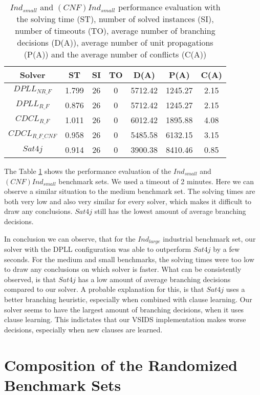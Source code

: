 \begin{table}[!htb]
\centering
\caption[$Ind_{small}$ and $(CNF)Ind_{small}$ performance evaluation]{$Ind_{small}$ and $(CNF)Ind_{small}$ performance evaluation with the solving time (ST), number of solved instances (SI), number of timeouts (TO), average number of branching decisions (D(A)), average number of unit propagations (P(A)) and the average number of conflicts (C(A))}
\label{tab:wBenchmarks}
\begin{tabular}{|c|c|c|c|c|c|c|}
\hline
Solver & ST & SI & TO & D(A) & P(A) & C(A)\\ 
\hline
$DPLL_{NR\_F}$ & 1.799 & 26 & 0 & 5712.42 & 1245.27 & 2.15 \\ 
\hline
$DPLL_{R\_F}$ & 0.876 & 26 & 0 & 5712.42 & 1245.27 & 2.15 \\ 
\hline
$CDCL_{R\_F}$ & 1.011 & 26 & 0 & 6012.42 & 1895.88 & 4.08 \\ 
\hline
$CDCL_{R\_F\_CNF}$ & 0.958 & 26 & 0 & 5485.58 & 6132.15 & 3.15 \\ 
\hline
$Sat4j$ & 0.914 & 26 & 0 & 3900.38 & 8410.46 & 0.85 \\ 
\hline
\end{tabular}
\end{table}

The Table \ref{tab:wBenchmarks} shows the performance evaluation of the $Ind_{small}$ and  $(CNF)Ind_{small}$ benchmark sets. We used a timeout of 2 minutes. Here we can observe a similar situation to the medium benchmark set. The solving times are both very low and also very similar for every solver, which makes it difficult to draw any conclusions. $Sat4j$ still has the lowest amount of average branching decisions.

In conclusion we can observe, that for the $Ind_{large}$ industrial benchmark set, our solver with the DPLL configuration was able to outperform $Sat4j$ by a few seconds. For the medium and small benchmarks, the solving times were too low to draw any conclusions on which solver is faster. What can be consistently observed, is that $Sat4j$ has a low amount of average branching decisions compared to our solver. A probable explanation for this, is that $Sat4j$ uses a better branching heuristic, especially when combined with clause learning. Our solver seems to have the largest amount of branching decisions, when it uses clause learning. This indictates that our VSIDS implementation makes worse decisions, especially when new clauses are learned.

\section{Composition of the Randomized Benchmark Sets}

